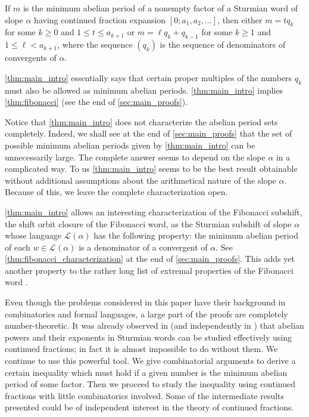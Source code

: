 \documentclass[a4paper,fleqn]{article}
\newcommand{\Lang}[2][]{\mathcal{L}_{#1}(#2)}
\begin{document}
  \begin{theorem}\label{thm:main_intro}
    If $m$ is the minimum abelian period of a nonempty factor of a Sturmian word of slope $\alpha$ having continued
    fraction expansion $[0; a_1, a_2, \ldots]$, then either $m = tq_k$ for some $k \geq 0$ and
    $1 \leq t \leq a_{k+1}$ or $m = \ell q_k + q_{k-1}$ for some $k \geq 1$ and $1 \leq \ell < a_{k+1}$, where the
    sequence $(q_k)$ is the sequence of denominators of convergents of $\alpha$.
  \end{theorem}

  \autoref{thm:main_intro} essentially says that certain proper multiples of the numbers $q_k$ must also be allowed as
  minimum abelian periods. \autoref{thm:main_intro} implies \autoref{thm:fibonacci} (see the end of
  \autoref{sec:main_proofs}).

  Notice that \autoref{thm:main_intro} does not characterize the abelian period sets completely. Indeed, we shall see
  at the end of \autoref{sec:main_proofs} that the set of possible minimum abelian periods given by
  \autoref{thm:main_intro} can be unnecessarily large. The complete answer seems to depend on the slope $\alpha$ in a
  complicated way. To us \autoref{thm:main_intro} seems to be the best result obtainable without additional assumptions
  about the arithmetical nature of the slope $\alpha$. Because of this, we leave the complete characterization open.

  \autoref{thm:main_intro} allows an interesting characterization of the Fibonacci subshift, the shift orbit closure of
  the Fibonacci word, as the Sturmian subshift of slope $\alpha$ whose language $\Lang{\alpha}$ has the following
  property: the minimum abelian period of each $w \in \Lang{\alpha}$ is a denominator of a convergent of $\alpha$. See
  \autoref{thm:fibonacci_characterization} at the end of \autoref{sec:main_proofs}. This adds yet another property to
  the rather long list of extremal properties of the Fibonacci word
  \cite{2008:on_extremal_properties_of_the_fibonacci_word,2013:some_extremal_properties_of_the_fibonacci_word,2014:lyndon_words_and_fibonacci_numbers}.

  Even though the problems considered in this paper have their background in combinatorics and formal languages, a
  large part of the proofs are completely number-theoretic. It was already observed in
  \cite{2016:abelian_powers_and_repetitions_in_sturmian_words} (and independently in
  \cite{2013:some_properties_of_abelian_return_words}) that abelian powers and their exponents in Sturmian words can be
  studied effectively using continued fractions; in fact it is almost impossible to do without them. We continue to use
  this powerful tool. We give combinatorial arguments to derive a certain inequality which must hold if a given number
  is the minimum abelian period of some factor. Then we proceed to study the inequality using continued fractions with
  little combinatorics involved. Some of the intermediate results presented could be of independent interest in the
  theory of continued fractions.
\end{document}

